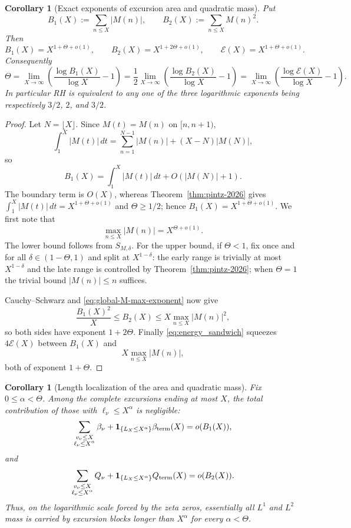 \documentclass[11pt]{amsart}
\numberwithin{equation}{section}
\theoremstyle{plain}
\newtheorem{corollary}[theorem]{Corollary}
\theoremstyle{definition}
\theoremstyle{remark}
\newcommand{\En}{\mathcal{E}}
\begin{document}
\begin{corollary}[Exact exponents of excursion area and quadratic mass]
\label{cor:pintz-excursion-exponents}
Put
\[
 B_1(X):=\sum_{n\le X}|M(n)|,
 \qquad
 B_2(X):=\sum_{n\le X}M(n)^2.
\]
Then
\begin{equation}
\label{eq:pintz-B1-B2}
 B_1(X)=X^{1+\Theta+o(1)},
 \qquad
 B_2(X)=X^{1+2\Theta+o(1)},
 \qquad
 \En(X)=X^{1+\Theta+o(1)}.
\end{equation}
Consequently
\begin{equation}
\label{eq:Theta-from-excursions}
 \Theta=\lim_{X\to\infty}\left(\frac{\log B_1(X)}{\log X}-1\right)
 =\frac12\lim_{X\to\infty}
 \left(\frac{\log B_2(X)}{\log X}-1\right)
 =\lim_{X\to\infty}\left(\frac{\log\En(X)}{\log X}-1\right).
\end{equation}
In particular RH is equivalent to any one of the three logarithmic exponents
being respectively $3/2$, $2$, and $3/2$.
\end{corollary}

\begin{proof}
Let $N=\lfloor X\rfloor$.  Since $M(t)=M(n)$ on $[n,n+1)$,
\[
 \int_1^X|M(t)|\,dt
 =\sum_{n=1}^{N-1}|M(n)|+(X-N)|M(N)|,
\]
so
\[
 B_1(X)=\int_1^X|M(t)|\,dt+O(|M(N)|+1).
\]
The boundary term is $O(X)$, whereas Theorem~\ref{thm:pintz-2026} gives
$\int_1^X|M(t)|\,dt=X^{1+\Theta+o(1)}$ and $\Theta\ge1/2$; hence
$B_1(X)=X^{1+\Theta+o(1)}$.
We first note that
\begin{equation}
\label{eq:global-M-max-exponent}
 \max_{n\le X}|M(n)|=X^{\Theta+o(1)}.
\end{equation}
The lower bound follows from $S_{M,\delta}$.  For the upper bound, if $\Theta<1$, fix once and for all
$\delta\in(1-\Theta,1)$ and split at
$X^{1-\delta}$: the early range is trivially at most $X^{1-\delta}$ and the
late range is controlled by Theorem~\ref{thm:pintz-2026}; when $\Theta=1$
the trivial bound $|M(n)|\le n$ suffices.

Cauchy--Schwarz and \eqref{eq:global-M-max-exponent} now give
\[
 \frac{B_1(X)^2}{X}\le B_2(X)
 \le X\max_{n\le X}|M(n)|^2,
\]
so both sides have exponent $1+2\Theta$.  Finally
\eqref{eq:energy_sandwich} squeezes $4\En(X)$ between $B_1(X)$ and
\[
 X\max_{n\le X}|M(n)|,
\]
both of exponent $1+\Theta$.
\end{proof}

\begin{corollary}[Length localization of the area and quadratic mass]
\label{cor:pintz-length-localization}
Fix $0\le\alpha<\Theta$.  Among the complete excursions ending at most $X$,
the total contribution of those with $\ell_\nu\le X^\alpha$ is negligible:
\[
 \sum_{\substack{v_\nu\le X\\ \ell_\nu\le X^\alpha}}\beta_\nu
 +\mathbf 1_{\{L_X\le X^\alpha\}}\beta_{\rm term}(X)
 =o(B_1(X)),
\]
and
\[
 \sum_{\substack{v_\nu\le X\\ \ell_\nu\le X^\alpha}}Q_\nu
 +\mathbf 1_{\{L_X\le X^\alpha\}}Q_{\rm term}(X)
 =o(B_2(X)).
\]
Thus, on the logarithmic scale forced by the zeta zeros, essentially all
$L^1$ and $L^2$ mass is carried by excursion blocks longer than
$X^\alpha$ for every $\alpha<\Theta$.
\end{corollary}
\end{document}
